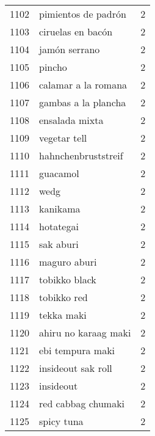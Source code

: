 \begin{tabular}{llr}
1102 &                                pimientos de padrón &      2 \\
1103 &                                  ciruelas en bacón &      2 \\
1104 &                                      jamón serrano &      2 \\
1105 &                                             pincho &      2 \\
1106 &                                calamar a la romana &      2 \\
1107 &                                gambas a la plancha &      2 \\
1108 &                                     ensalada mixta &      2 \\
1109 &                                       vegetar tell &      2 \\
1110 &                                hahnchenbruststreif &      2 \\
1111 &                                           guacamol &      2 \\
1112 &                                               wedg &      2 \\
1113 &                                           kanikama &      2 \\
1114 &                                          hotategai &      2 \\
1115 &                                          sak aburi &      2 \\
1116 &                                       maguro aburi &      2 \\
1117 &                                      tobikko black &      2 \\
1118 &                                        tobikko red &      2 \\
1119 &                                         tekka maki &      2 \\
1120 &                               ahiru no karaag maki &      2 \\
1121 &                                   ebi tempura maki &      2 \\
1122 &                                 insideout sak roll &      2 \\
1123 &                                          insideout &      2 \\
1124 &                                 red cabbag chumaki &      2 \\
1125 &                                         spicy tuna &      2 \\

\end{tabular}
